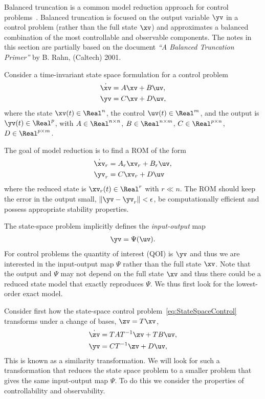 \label{sec:balancedTruncation}

Balanced truncation is a common model reduction approach for control problems~\cite{ZhouDoyleGlover1996,DullerudPaganini2000,GugercinAntoulas2004}.
Balanced truncation is focused on the output variable $\yv$ in a control problem (rather
than the full state $\xv$) and approximates a balanced combination of the most controllable and observable components. 
The notes in this section are partially based on the document {\em ``A Balanced Truncation Primer''}
by B. Rahn, (Caltech) 2001. 


Consider a time-invariant state space formulation for a control problem
\begin{align}
    \dot\xv &= A \xv + B \uv ,   \label{eq:StateSpaceControl} \\
     \yv &= C \xv + D \uv , 
\end{align}
where the state $\xv(t)\in\Real^n$, the control $\uv(t)\in\Real^m$, and the output is $\yv(t)\in \Real^p$, with
$A\in\Real^{n\times n}$, $B\in\Real^{n\times m}$, $C\in\Real^{p\times n}$, $D\in\Real^{p\times m}$.

The goal of model reduction is to find a ROM of the form
\begin{align}
    \dot\xv_r &= A_r \xv_r + B_r \uv ,\\
     \yv_r &= C \xv_r + D \uv 
\end{align}
where the reduced state is $\xv_r(t)\in\Real^r$ with $r\ll n$. The ROM should
keep the error in the output small, $\| \yv - \yv_r \| < \epsilon$, be computationally
efficient and possess appropriate stability properties. 


The state-space problem implicitly defines the {\em input-output} map
\begin{align}
     \yv = \Psi(\uv) . 
\end{align}
For control problems the quantity of interest (QOI) is $\yv$ and thus we 
are interested in the input-output map $\Psi$ rather than the full state $\xv$. 
Note that the output and $\Psi$ may not depend on the full state $\xv$ and thus
there could be a reduced state model that exactly reproduces $\Psi$. We thus
first look for the lowest-order exact model. 

 \label{sec:lowestOrderExactModel}

Consider first how the state-space control 
problem~\eqref{eq:StateSpaceControl} transforms under
a change of bases, $\zv=T\xv$, 
\begin{align}
    \dot\zv &= T A T^{-1} \zv + T B \uv ,   \label{eq:StateSpaceControlTransformed} \\
     \yv &= CT^{-1} \zv + D \uv , 
\end{align}
This is known as a similarity transformation. We will look for such a transformation
that reduces the state space problem to a smaller problem that gives the same
input-output map $\Psi$. To do this we consider the properties of controllability and
observability.


